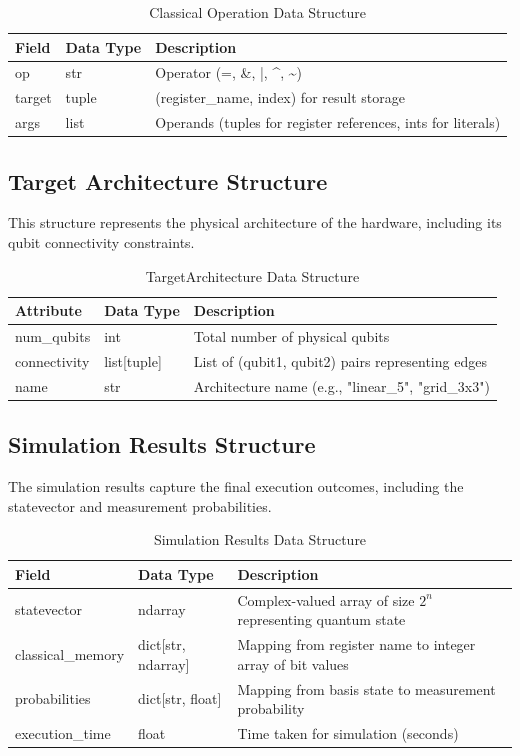 \begin{table}[H]
\centering
\caption{Classical Operation Data Structure}
\begin{tabular}{|p{3cm}|p{2.5cm}|p{7cm}|}
\hline
\textbf{Field} & \textbf{Data Type} & \textbf{Description} \\
\hline
op & str & Operator (=, \&, |, \^{}, \~{}) \\
\hline
target & tuple & (register\_name, index) for result storage \\
\hline
args & list & Operands (tuples for register references, ints for literals) \\
\hline
\end{tabular}
\end{table}

\subsection{Target Architecture Structure}
This structure represents the physical architecture of the hardware, including its qubit connectivity constraints.

\begin{table}[H]
\centering
\caption{TargetArchitecture Data Structure}
\begin{tabular}{|p{3cm}|p{2.5cm}|p{7cm}|}
\hline
\textbf{Attribute} & \textbf{Data Type} & \textbf{Description} \\
\hline
num\_qubits & int & Total number of physical qubits \\
\hline
connectivity & list[tuple] & List of (qubit1, qubit2) pairs representing edges \\
\hline
name & str & Architecture name (e.g., "linear\_5", "grid\_3x3") \\
\hline
\end{tabular}
\end{table}

\subsection{Simulation Results Structure}
The simulation results capture the final execution outcomes, including the statevector and measurement probabilities.

\begin{table}[H]
\centering
\caption{Simulation Results Data Structure}
\begin{tabular}{|p{3cm}|p{2.5cm}|p{7cm}|}
\hline
\textbf{Field} & \textbf{Data Type} & \textbf{Description} \\
\hline
statevector & ndarray & Complex-valued array of size $2^n$ representing quantum state \\
\hline
classical\_memory & dict[str, ndarray] & Mapping from register name to integer array of bit values \\
\hline
probabilities & dict[str, float] & Mapping from basis state to measurement probability \\
\hline
execution\_time & float & Time taken for simulation (seconds) \\
\hline
\end{tabular}
\end{table}

